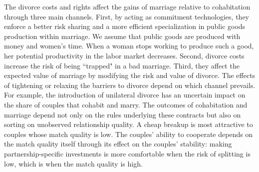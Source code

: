 \documentclass[12pt]{article}
\numberwithin{table}{section}
\begin{document}
The divorce costs and rights affect the gains of marriage relative to cohabitation through three main channels. First, by acting as commitment technologies, they enforce a better risk sharing and a more efficient specialization in public goods production within marriage. We assume that public goods are produced with money and women's time. When a woman stops working to produce such a good, her potential productivity in the labor market decreases. Second, divorce costs increase the risk of being ``trapped" in a bad marriage. Third, they affect the expected value of marriage by modifying the risk and value of divorce. The effects of tightening or relaxing the barriers to divorce depend on which channel prevails. For example, the introduction of unilateral divorce has an uncertain impact on the share of couples that cohabit and marry. The outcomes of cohabitation and marriage depend not only on the rules underlying these contracts but also on sorting on unobserved relationship quality. A cheap breakup is most attractive to couples whose match quality is low. The couples' ability to cooperate depends on the match quality itself through its effect on the couples' stability: making partnership-specific investments is more comfortable when the risk of splitting is low, which is when the match quality is high.




\end{document}
